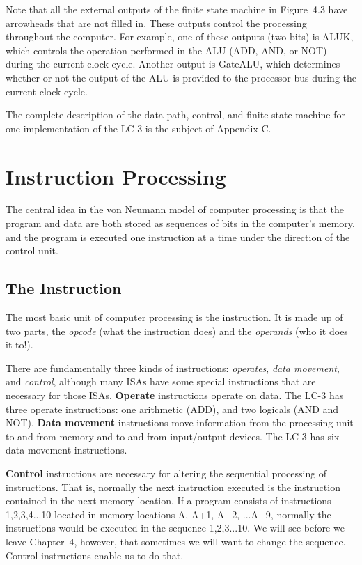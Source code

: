 \documentclass{patt}
\begin{document}
Note that all the external outputs of the finite
state machine in Figure~4.3 have arrowheads that are not filled in.  These
outputs control the processing throughout the computer.  For example, one of
these outputs (two bits) is ALUK, which controls the operation performed in
the ALU (ADD, AND, or NOT) during the current clock cycle.  Another output is
GateALU, which determines whether or not the output of the ALU
is provided to the processor bus during the current clock cycle.

The complete description of the data path, control, and finite state machine
for one implementation of the LC-3 is the subject of Appendix C.

\vspace{-9pt}

\section{Instruction Processing}
The central idea in the von Neumann model of computer processing is that 
the program and data are both stored as sequences of bits in the computer's 
memory, and the program is executed one instruction at a time under the 
direction of the control unit.

\subsection{The Instruction}
The most basic unit of computer processing is the instruction.  It is
made up of two parts, the {\em opcode} (what the instruction does) and the
{\em operands} (who it does it to!).

There are fundamentally three kinds of instructions: {\em operates}, 
{\em data movement}, and {\em control}, although many ISAs have some
special instructions that are necessary for those ISAs.
{\bf Operate} instructions operate on data.  The LC-3 has
three operate instructions: one arithmetic (ADD), and two logicals
(AND and NOT).  {\bf Data movement} instructions move information from
the processing unit to and from memory and to and from input/output devices.
The LC-3 has six data movement instructions.  

{\bf Control} instructions are necessary for altering the sequential 
processing of instructions. That is, normally the next instruction executed 
is the instruction contained in the next memory location.  If a program 
consists of instructions 1,2,3,4...10 located in memory locations A, A+1,
A+2, ...A+9, normally the instructions would be executed in the sequence
1,2,3...10.  We will see before we leave Chapter~4, however, that sometimes 
we will want to change the sequence.  Control instructions enable us to do 
that.
\end{document}
